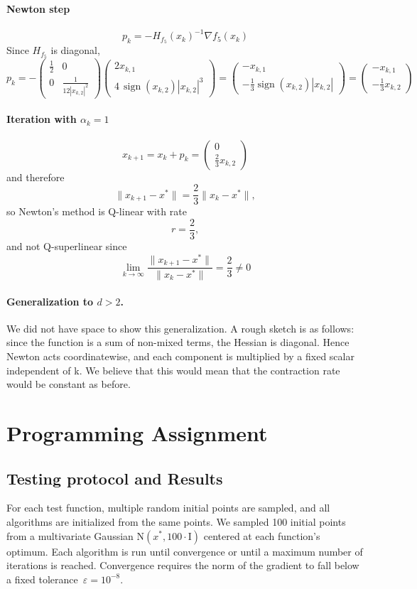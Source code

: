\documentclass[11pt,a4paper]{article}
\begin{document}
\paragraph{Newton step}
\[
p_k=-H_{f_5}(x_k)^{-1}\nabla f_5(x_k)
\]
Since \(H_{f_5}\) is diagonal,
\[
p_k=
-\begin{pmatrix}
\frac12 & 0\\
0 & \frac{1}{12|x_{k,2}|^2}
\end{pmatrix}
\begin{pmatrix}
2x_{k,1}\\
4\,\operatorname{sign}(x_{k,2})|x_{k,2}|^3
\end{pmatrix}
=
\begin{pmatrix}
-x_{k,1}\\[2pt]
-\frac{1}{3}\operatorname{sign}(x_{k,2})|x_{k,2}|
\end{pmatrix}
=
\begin{pmatrix}
-x_{k,1}\\
-\frac{1}{3}x_{k,2}
\end{pmatrix}
\]

\paragraph{Iteration with \(\alpha_k=1\)}
\[
x_{k+1}=x_k+p_k=
\begin{pmatrix}
0\\
\frac{2}{3}x_{k,2}
\end{pmatrix}
\]
and therefore
\[
\|x_{k+1}-x^*\|=\frac{2}{3}\|x_k-x^*\|,
\]
so Newton’s method is Q-linear with rate
\[
r=\frac{2}{3},
\]
and not Q-superlinear since
\[
\lim_{k\to\infty}\frac{\|x_{k+1}-x^*\|}{\|x_k-x^*\|}=\frac{2}{3}\neq 0
\]

\paragraph{Generalization to \(d>2\).}
We did not have space to show this generalization. A rough sketch is as follows: since the function is a sum of non-mixed terms, the Hessian is diagonal. Hence Newton acts coordinatewise, and each component is multiplied by a fixed scalar independent of k. We believe that this would mean that the contraction rate would be constant as before.


\section{Programming Assignment}

\subsection{Testing protocol and Results}
For each test function, multiple random initial points are sampled, and all algorithms are initialized from the same points. We sampled 100 initial points from a multivariate Gaussian $\text{N}(x^*,100 \cdot \text{I})$ centered at each function's optimum. Each algorithm is run until convergence or until a maximum number of iterations is reached. Convergence requires the norm of the gradient to fall below a fixed tolerance~$\varepsilon = 10^{-8}$.
\end{document}

